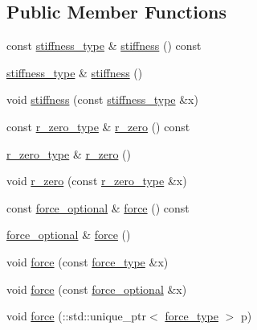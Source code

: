 \subsection*{Public Member Functions}
\begin{DoxyCompactItemize}
\item 
const \hyperlink{classmembrane__t_a9e55619d3d02a55660849deaa0ca4338}{stiffness\+\_\+type} \& \hyperlink{classmembrane__t_a798d5aac4ed960e2ad95d675c89e27a2}{stiffness} () const 
\item 
\hyperlink{classmembrane__t_a9e55619d3d02a55660849deaa0ca4338}{stiffness\+\_\+type} \& \hyperlink{classmembrane__t_a3f9153cf9ac73898479bf5722b6531ef}{stiffness} ()
\item 
void \hyperlink{classmembrane__t_ae30350a7d27308cd43ebdef96e3a159c}{stiffness} (const \hyperlink{classmembrane__t_a9e55619d3d02a55660849deaa0ca4338}{stiffness\+\_\+type} \&x)
\item 
const \hyperlink{classmembrane__t_ab1e0c179101c4b2916059925d73468ff}{r\+\_\+zero\+\_\+type} \& \hyperlink{classmembrane__t_aa2e292d4f0aa5c09a75596c85c373ec3}{r\+\_\+zero} () const 
\item 
\hyperlink{classmembrane__t_ab1e0c179101c4b2916059925d73468ff}{r\+\_\+zero\+\_\+type} \& \hyperlink{classmembrane__t_a859cf64e389832eada24f2776501e879}{r\+\_\+zero} ()
\item 
void \hyperlink{classmembrane__t_aca35bd2dc12a569910c52e9b4b5a4b53}{r\+\_\+zero} (const \hyperlink{classmembrane__t_ab1e0c179101c4b2916059925d73468ff}{r\+\_\+zero\+\_\+type} \&x)
\item 
const \hyperlink{classmembrane__t_a558422b23faa72b3e4cbc060f9ff8ea3}{force\+\_\+optional} \& \hyperlink{classmembrane__t_a0746bbae2169a7afca45b7e2d10db24d}{force} () const 
\item 
\hyperlink{classmembrane__t_a558422b23faa72b3e4cbc060f9ff8ea3}{force\+\_\+optional} \& \hyperlink{classmembrane__t_a6f0d435bd62b2b8b436589fcb5c1b7fb}{force} ()
\item 
void \hyperlink{classmembrane__t_ac6e5247264e0fb528a1e804b66782ff8}{force} (const \hyperlink{classmembrane__t_ab4d91a3ba331c16adbf69418f876f849}{force\+\_\+type} \&x)
\item 
void \hyperlink{classmembrane__t_aae94af1cb55045583a9fa0d471c64cc4}{force} (const \hyperlink{classmembrane__t_a558422b23faa72b3e4cbc060f9ff8ea3}{force\+\_\+optional} \&x)
\item 
void \hyperlink{classmembrane__t_a6bc29b3af98820be7dd1187c0c736e4d}{force} (\+::std\+::unique\+\_\+ptr$<$ \hyperlink{classmembrane__t_ab4d91a3ba331c16adbf69418f876f849}{force\+\_\+type} $>$ p)

\end{DoxyCompactItemize}
